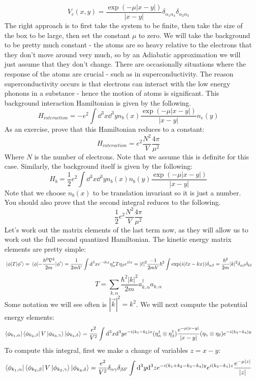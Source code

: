 \documentclass{article}
\begin{document}
\[V_c(x,y)=\frac{\exp(-\mu|x-y|)}{|x-y|}\delta_{\alpha_1\alpha_4}\delta_{\alpha_2\alpha_3}\]
The right approach is to first take the system to be finite, then take the size of the box to be large, then set the constant $\mu$ to zero. We will take the background to be pretty much constant - the atoms are so heavy relative to the electrons that they don't move around very much, so by an Adiabatic approximation we will just assume that they don't change. There are occasionally situations where the response of the atoms are crucial - such as in superconductivity. The reason superconductivity occurs is that electrons can interact with the low energy phonons in a substance - hence the motion of atoms is significant. This background interaction Hamiltonian is given by the following.
\begin{equation}
    H_{interaction} = -e^2 \int \dd^3 x \dd^3 y  n_b(x) \frac{\exp(-\mu|x-y|)}{|x-y|}n_e(y)
\end{equation}
As an exercise, prove that this Hamiltonian reduces to a constant:
\[H_{interaction} = e^2\frac{N^2}{V}\frac{4\pi}{\mu^2}\]
Where $N$ is the number of electrons. Note that we assume this is definite for this case. Similarly, the background itself is given by the following:
\begin{equation}
H_b = \frac{1}{2}e^2\int\dd^3 x \dd^3 y n_b(x) n_b(y)\frac{\exp(-\mu|x-y|)}{|x-y|}
\end{equation}
Note that we choose $n_b(x)$ to be translation invariant so it is just a number. You should also prove that the second integral reduces to the following.
\[\frac{1}{2}e^2 \frac{N^2}{V}\frac{4\pi}{\mu^2}\]
Let's work out the matrix elements of the last term now, as they will allow us to work out the full second quantized Hamiltonian. The kinetic energy matrix elements are pretty simple:
\[\mel{\phi}{T}{\phi'}=\mel{\phi}{-\frac{\hbar^2\nabla^2}{2m}}{\phi'} = \frac{1}{2mV}\int \dd^3 x e^{-ikx}\eta_\alpha^* T \eta_\beta e^{i\ell x} = |\ell|^2\frac{-1}{2mV}\hbar^2\int \exp(i(\ell x - kx))\delta_{\alpha \beta} = \frac{\hbar^2}{2m}|k|^2\delta_{\alpha \beta}\delta_{k \ell}\]
\begin{equation}
T =\sum_{k,\alpha} \frac{\hbar^2 |k|^2}{2m}a^\dagger_{k,\alpha}a_{k,\alpha}
\end{equation}
Some notation we will see often is $|\vec{k}|^2 = k^2$. We will next compute the potential energy elements:
\[\bra{\phi_{k_1,\alpha}}\bra{\phi_{k_2,\beta}}V\ket{\phi_{k_3,\gamma}}\ket{\phi_{k_4,\delta}}= \frac{e^2}{V^2}\int\dd^3 x\dd^3 y e^{-i(k_1-k_2)x}(\eta_\alpha^\dagger \otimes \eta_\beta^\dagger)\frac{e^{-\mu|x-y|}}{|x-y|}(\eta_\gamma\otimes \eta_\delta)e^{-i(k_3-k_4)y}\]
To compute this integral, first we make a change of variables $z = x-y$:
\[\bra{\phi_{k_1,\alpha}}\bra{\phi_{k_2,\beta}}V\ket{\phi_{k_3,\gamma}}\ket{\phi_{k_4,\delta}}= \frac{e^2}{V^2}\delta_{\alpha \gamma}\delta_{\beta \delta'}\int \dd^3 y \dd^3 z e^{-i(k_1+k_2-k_3-k_4)y}e^{i(k_3-k_1)z}\frac{e^{-\mu|z|}}{|z|}\]

\nocite{*}
\printbibliography
\end{document}
